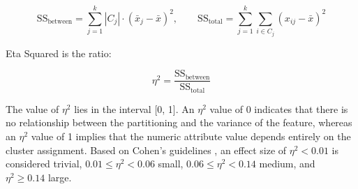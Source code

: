 \begin{equation}
    \mathrm{SS}_{\mathrm{between}} = \sum_{j=1}^{k} |C_j| \cdot (\bar{x}_j - \bar{x})^2, \qquad
    \mathrm{SS}_{\mathrm{total}} = \sum_{j=1}^{k} \sum_{i \in C_j} (x_{ij} - \bar{x})^2
    \label{eq:ss}
\end{equation}

Eta Squared is the ratio:

\begin{equation}
    \eta^2 = \frac{\mathrm{SS}_{\mathrm{between}}}{\mathrm{SS}_{\mathrm{total}}}
    \label{eq:eta_squared}
\end{equation}

The value of $\eta^2$ lies in the interval [0, 1]. An $\eta^2$ value of 0 indicates that there is no relationship between the partitioning and the variance of the feature, whereas an $\eta^2$ value of 1 implies that the numeric attribute value depends entirely on the cluster assignment. Based on Cohen's guidelines \cite{cohen1988}, an effect size of $\eta^2 < 0.01$ is considered trivial, $0.01 \leq \eta^2 < 0.06$ small, $0.06 \leq \eta^2 < 0.14$ medium, and $\eta^2 \geq 0.14$ large.
